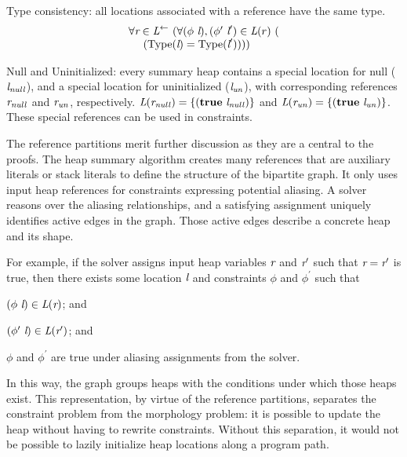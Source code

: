 Type consistency: all locations associated with a reference have the same type.
\[
\begin{array}{l}
\forall \cfgnt{r} \in \cfgnt{L}^\leftarrow\ (\forall (\phi\ \cfgnt{l}),(\phi^\prime\ \cfgnt{l}^\prime) \in \cfgnt{L}(r)\ (\\
\ \ \ \ (\mathrm{Type}\lp\cfgnt{l}\rp = \mathrm{Type}\lp\cfgnt{l}^\prime\rp)))
\end{array}
\]

Null and Uninitialized: every summary heap contains 
a special location for null ($\emph{l}_\mathit{null}$), and a special
location for uninitialized
  ($\emph{l}_\mathit{un}$), with corresponding references
  $\emph{r}_\mathit{null}$ and
  $\emph{r}_\mathit{un}$, respectively. $\emph{L}(\emph{r}_\mathit{null}) =
  \{(\textbf{true}\ \emph{l}_\mathit{null})\}$ and
  $\emph{L}(\emph{r}_\mathit{un}) =
  \{(\textbf{true}\ \emph{l}_\mathit{un})\}$. These special references can be used in constraints.

The reference partitions merit further discussion as they are a
central to the proofs. The heap summary algorithm creates
many references that are auxiliary literals or stack literals to
define the structure of the bipartite graph.  It only uses input heap
references for constraints expressing potential aliasing. A solver
reasons over the aliasing relationships, and a satisfying assignment
uniquely identifies active edges in the graph. Those active edges
describe a concrete heap and its shape.

For example, if the solver assigns input heap variables $\emph{r}$ and $\emph{r}^\prime$
such that $\emph{r} = \emph{r}^\prime$ is true, then there exists
some location $\emph{l}$ and constraints $\phi$ and $\phi^\prime$ such
that
\begin{compactitem}
\item $(\phi\ \emph{l}) \in \emph{L}(\emph{r})$; and
\item $(\phi^\prime\ \emph{l}) \in \emph{L}(\emph{r}^\prime)$; and
\item $\phi$ and $\phi^\prime$ are true under aliasing assignments from the solver.
\end{compactitem}
In this way, the graph groups heaps with the conditions under which
those heaps exist. This representation, by virtue of the reference
partitions, separates the constraint problem from the morphology
problem: it is possible to update the heap without having to rewrite
constraints. Without this separation, it would not be possible to
lazily initialize heap locations along a program path.

